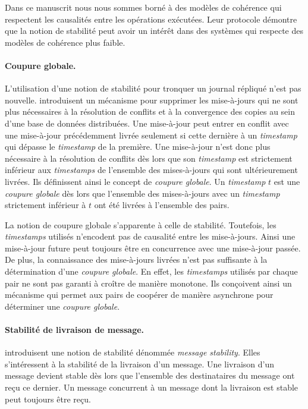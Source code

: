 Dans ce manuscrit nous nous sommes borné à des modèles de cohérence qui respectent les causalités entre les opérations exécutées.
Leur protocole démontre que la notion de stabilité peut avoir un intérêt dans des systèmes qui respecte des modèles de cohérence plus faible.

\paragraph{Coupure globale.} L'utilisation d'une notion de stabilité pour tronquer un journal répliqué n'est pas nouvelle.
\textcite{sarin_1987_discarding} introduisent un mécanisme pour supprimer les mise-à-jours qui ne sont plus nécessaires à la résolution de conflits et à la convergence des copies au sein d'une base de données distribuées.
Une mise-à-jour peut entrer en conflit avec une mise-à-jour précédemment livrée seulement si cette dernière à un \emph{timestamp} qui dépasse le \emph{timestamp} de la première.
Une mise-à-jour n'est donc plus nécessaire à la résolution de conflits dès lors que son \emph{timestamp} est strictement inférieur aux \emph{timestamps} de l'ensemble des mises-à-jours
qui sont ultérieurement livrées.
Ils définissent ainsi le concept de \emph{coupure globale}.
Un \emph{timestamp} $t$ est une \emph{coupure globale} dès lors que l'ensemble des mises-à-jours avec un \emph{timestamp} strictement inférieur à $t$ ont été livrées à l'ensemble des pairs.

La notion de coupure globale s'apparente à celle de stabilité.
Toutefois, les \emph{timestamps} utilisés n'encodent pas de causalité entre les mise-à-jours.
Ainsi une mise-à-jour future peut toujours être en concurrence avec une mise-à-jour passée.
De plus, la connaissance des mise-à-jours livrées n'est pas suffisante à la détermination d'une \emph{coupure globale}.
En effet, les \emph{timestamps} utilisés par chaque pair ne sont pas garanti à croître de manière monotone.
Ils conçoivent ainsi un mécanisme qui permet aux pairs de coopérer de manière asynchrone pour déterminer une \emph{coupure globale}.

\paragraph{Stabilité de livraison de message.} \textcite{birman_1991_causalmulticast} introduisent une notion de stabilité dénommée \emph{message stability}.
Elles s'intéressent à la stabilité de  la livraison d'un message.
Une livraison d'un message devient stable dès lors que l'ensemble des destinataires du message ont reçu ce dernier.
Un message concurrent à un message dont la livraison est stable peut toujours être reçu.


